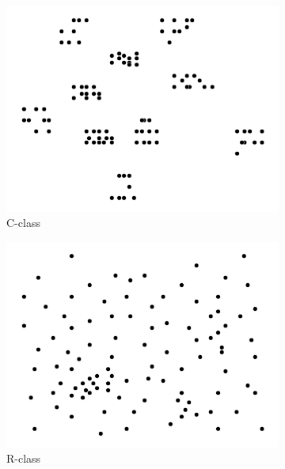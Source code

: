 \begin{figure}[H] %
	\label{fig:perf_ct_c1}
	\begin{subfigure}{.3\textwidth}
		\centering
		\includegraphics[width=1\linewidth]{figures/cls_c.png}
		\caption{C-class}
		\label{fig:cls_c}
	\end{subfigure}%
	\begin{subfigure}{.3\textwidth}
		\centering
		\includegraphics[width=1\linewidth]{figures/cls_r.png}
		\caption{R-class}
		\label{fig:cls_r}
	\end{subfigure}
	\begin{subfigure}{.3\textwidth}
		\centering

\end{subfigure}
\end{figure}
